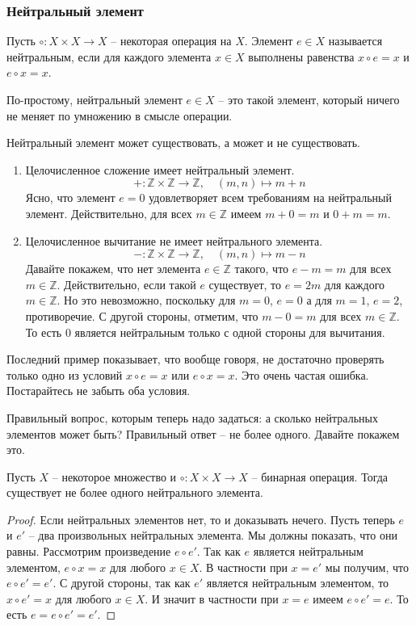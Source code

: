 \subsubsection{Нейтральный элемент}

\begin{definition}
Пусть $\circ \colon X\times X\to X$ -- некоторая операция на $X$.
Элемент $e\in X$ называется нейтральным, если для каждого элемента $x\in X$ выполнены равенства $x\circ e = x$ и $e \circ x = x$.
\end{definition}

По-простому, нейтральный элемент $e\in X$ -- это такой элемент, который ничего не меняет по умножению в смысле операции.

\begin{examples}
Нейтральный элемент может существовать, а может и не существовать.
\begin{enumerate}
\item Целочисленное сложение имеет нейтральный элемент.
\[
+\colon \mathbb Z\times \mathbb Z\to \mathbb Z,\quad (m,n)\mapsto m+n
\]
Ясно, что элемент $e = 0$ удовлетворяет всем требованиям на нейтральный элемент.
Действительно, для всех $m\in \mathbb Z$ имеем $m + 0 = m$ и $0 + m = m$.

\item Целочисленное вычитание не имеет нейтрального элемента.
\[
-\colon \mathbb Z\times \mathbb Z\to \mathbb Z,\quad (m,n)\mapsto m-n
\]
Давайте покажем, что нет элемента $e\in \mathbb Z$ такого, что $e - m = m$ для всех $m\in \mathbb Z$.
Действительно, если такой $e$ существует, то $e = 2m$ для каждого $m\in \mathbb Z$.
Но это невозможно, поскольку для $m = 0$, $e = 0$ а для $m = 1$, $e = 2$, противоречие.
С другой стороны, отметим, что $m - 0 = m$ для всех $m\in \mathbb Z$.
То есть $0$ является нейтральным только с одной стороны для вычитания.
\end{enumerate}
\end{examples}

Последний пример показывает, что вообще говоря, не достаточно проверять только одно из условий $x \circ e = x$ или $e \circ x = x$.
Это очень частая ошибка.
Постарайтесь не забыть оба условия.

Правильный вопрос, которым теперь надо задаться: а сколько нейтральных элементов может быть?
Правильный ответ -- не более одного.
Давайте покажем это.

\begin{claim}
Пусть $X$ -- некоторое множество и $\circ \colon X\times X\to X$ -- бинарная операция.
Тогда существует не более одного нейтрального элемента.
\end{claim}
\begin{proof}
Если нейтральных элементов нет, то и доказывать нечего.
Пусть теперь $e$ и $e'$ -- два произвольных нейтральных элемента.
Мы должны показать, что они равны.
Рассмотрим произведение $e \circ e'$.
Так как $e$ является нейтральным элементом,  $e \circ x = x$ для любого $x\in X$.
В частности при  $x = e'$ мы получим, что $e \circ e' = e'$.
С другой стороны, так как $e'$ является нейтральным элементом, то $x \circ e' = x$ для любого $x\in X$.
И значит в частности при $x = e$ имеем $e \circ e' = e$.
То есть $e = e\circ e' = e'$.
\end{proof}

